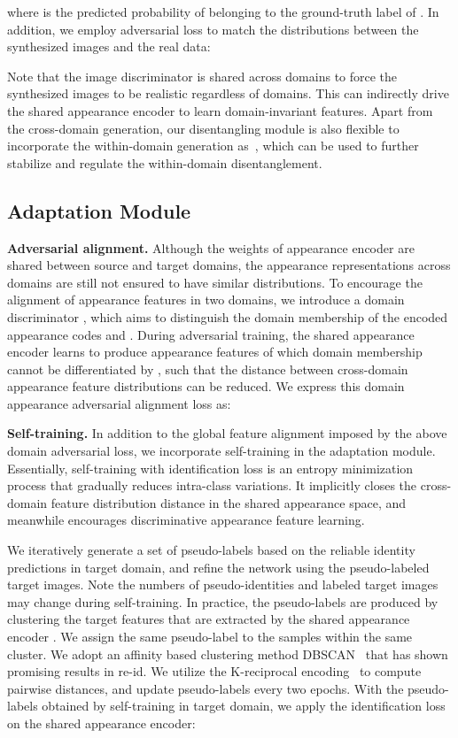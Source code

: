 \documentclass[runningheads]{llncs}
\begin{document}
\noindent where  is the predicted probability of  belonging to the ground-truth label  of .
In addition, we employ adversarial loss to match the distributions between the synthesized images and the real data:

\noindent Note that the image discriminator  is shared across domains to force the synthesized images to be realistic regardless of domains. This can indirectly drive the shared appearance encoder to learn domain-invariant features. Apart from the cross-domain generation, our disentangling module is also flexible to incorporate the within-domain generation as~\cite{zheng2019joint}, which can be used to further stabilize and regulate the within-domain disentanglement. 



\subsection{Adaptation Module}

\textbf{Adversarial alignment.} Although the weights of appearance encoder are shared between source and target domains, the appearance representations across domains are still not ensured to have similar distributions. To encourage the alignment of appearance features in two domains, we introduce a domain discriminator , which aims to distinguish the domain membership of the encoded appearance codes  and . During adversarial training, the shared appearance encoder learns to produce appearance features of which domain membership cannot be differentiated by , such that the distance between cross-domain appearance feature distributions can be reduced. We express this domain appearance adversarial alignment loss as:


\noindent\textbf{Self-training.}
In addition to the global feature alignment imposed by the above domain adversarial loss, we incorporate self-training in the adaptation module. Essentially, self-training with identification loss is an entropy minimization process that gradually reduces intra-class variations. It implicitly closes the cross-domain feature distribution distance in the shared appearance space, and meanwhile encourages discriminative appearance feature learning.

We iteratively generate a set of pseudo-labels  based on the reliable identity predictions in target domain, and refine the network using the pseudo-labeled target images. Note the numbers of pseudo-identities and labeled target images may change during self-training. In practice, the pseudo-labels are produced by clustering the target features that are extracted by the shared appearance encoder . We assign the same pseudo-label to the samples within the same cluster. We adopt an affinity based clustering method DBSCAN~\cite{ester1996density} that has shown promising results in re-id. We utilize the K-reciprocal encoding~\cite{zhong2017re} to compute pairwise distances, and update pseudo-labels every two epochs. With the pseudo-labels obtained by self-training in target domain, we apply the identification loss on the shared appearance encoder:
\end{document}
